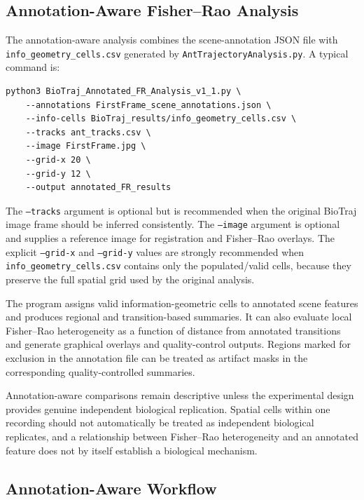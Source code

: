 \documentclass[11pt,a4paper]{article}
\begin{document}
\subsection{Annotation-Aware Fisher--Rao Analysis}

The annotation-aware analysis combines the scene-annotation JSON file with
\texttt{info\_geometry\_cells.csv} generated by
\texttt{AntTrajectoryAnalysis.py}. A typical command is:
\begin{lstlisting}
python3 BioTraj_Annotated_FR_Analysis_v1_1.py \
    --annotations FirstFrame_scene_annotations.json \
    --info-cells BioTraj_results/info_geometry_cells.csv \
    --tracks ant_tracks.csv \
    --image FirstFrame.jpg \
    --grid-x 20 \
    --grid-y 12 \
    --output annotated_FR_results
\end{lstlisting}

The \texttt{--tracks} argument is optional but is recommended when the
original BioTraj image frame should be inferred consistently. The
\texttt{--image} argument is optional and supplies a reference image for
registration and Fisher--Rao overlays. The explicit \texttt{--grid-x} and
\texttt{--grid-y} values are strongly recommended when
\texttt{info\_geometry\_cells.csv} contains only the populated/valid cells,
because they preserve the full spatial grid used by the original analysis.

The program assigns valid information-geometric cells to annotated scene
features and produces regional and transition-based summaries. It can also
evaluate local Fisher--Rao heterogeneity as a function of distance from
annotated transitions and generate graphical overlays and quality-control
outputs. Regions marked for exclusion in the annotation file can be treated
as artifact masks in the corresponding quality-controlled summaries.

Annotation-aware comparisons remain descriptive unless the experimental
design provides genuine independent biological replication. Spatial cells
within one recording should not automatically be treated as independent
biological replicates, and a relationship between Fisher--Rao heterogeneity
and an annotated feature does not by itself establish a biological mechanism.

\subsection{Annotation-Aware Workflow}
\end{document}

